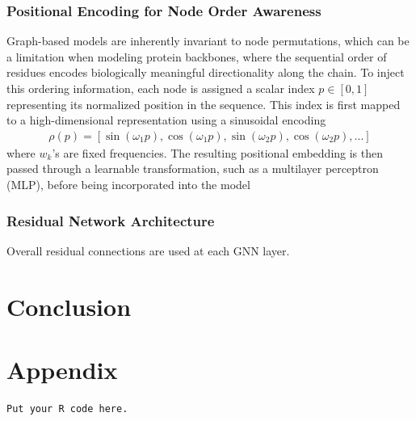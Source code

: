 \documentclass[a4paper,12pt]{article}
\begin{document}
\subsubsection{Positional Encoding for Node Order Awareness}
Graph-based models are inherently invariant to node permutations, which can be a limitation when modeling protein backbones, where the sequential order of residues encodes biologically meaningful directionality along the chain. To inject this ordering information, each node is assigned a scalar index \(p\in\left[0,1\right]\) representing its normalized position in the sequence. This index is first mapped to a high-dimensional representation using a sinusoidal encoding \cite{vaswaniAttentionAllYou2017}
\begin{align*}
    \rho\left(p\right)=\left[\sin\left(\omega_1 p\right),\cos\left(\omega_1 p\right),\sin\left(\omega_2 p\right),\cos\left(\omega_2 p\right),...\right]
\end{align*}
where \(w_k\)'s are fixed frequencies. The resulting positional embedding is then passed through a learnable transformation, such as a multilayer perceptron (MLP), before being incorporated into the model
\subsubsection{Residual Network Architecture}
Overall residual connections are used at each GNN layer.

\section{Conclusion}\label{sec:Conclusion}

\section*{Appendix}
\begin{verbatim}
Put your R code here.
\end{verbatim}



\end{document}
